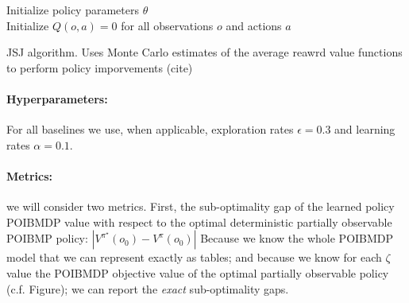\begin{algorithm}
    Initialize policy parameters $\theta$ \\
    Initialize $Q(o, a) = 0$ for all observations $o$ and actions $a$ \\
    \caption{JSJ algorithm. Uses Monte Carlo estimates of the average reawrd value functions to perform policy imporvements (cite)}\label{alg:jsj}
\end{algorithm}

\paragraph{Hyperparameters:} For all baselines we use, when applicable, exploration rates $\epsilon=0.3$ and learning rates $\alpha=0.1$.

\paragraph{Metrics:} we will consider two metrics.
First, the sub-optimality gap of the learned policy POIBMDP value with respect to the optimal deterministic partially observable POIBMP policy: $|V^\pi^{\star}(o_0) - V^\pi(o_0)|$
Because we know the whole POIBMDP model that we can represent exactly as tables; and because we know for each $\zeta$ value the POIBMDP objective value of the optimal partially observable policy (c.f. Figure); we can report the \textit{exact} sub-optimality gaps.


